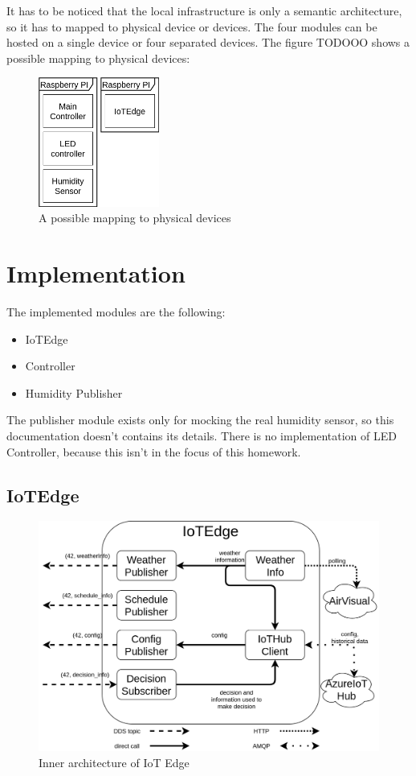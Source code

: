 \documentclass{article}
\begin{document}
It has to be noticed that the local infrastructure is only a semantic architecture, so it has to mapped to physical device or devices. The four modules can be hosted on a single device or four separated devices. The figure TODOOO shows a possible mapping to physical devices:
\begin{figure}[!htb]
\centering
  \includegraphics[width=150px]{imgs/phisical_mapping.png}
  \caption{A possible mapping to physical devices}
  \label{fig:phisical_mapping}
\end{figure}
\section{Implementation}
The implemented modules are the following:
\begin{itemize}
\item IoTEdge
\item Controller
\item Humidity Publisher
\end{itemize}
The publisher module exists only for mocking the real humidity sensor, so this documentation doesn't contains its details. There is no implementation of LED Controller, because this isn't in the focus of this homework.
\subsection{IoTEdge}
\begin{figure}[!htb]
  \includegraphics[width=\linewidth]{imgs/edge.png}
  \caption{Inner architecture of IoT Edge}
  \label{fig:arc_edge}
\end{figure}
\end{document}
